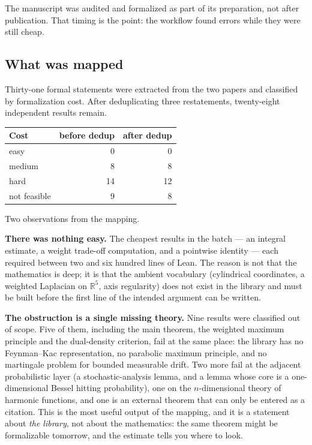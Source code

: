 \documentclass[11pt]{article}
\newcommand{\Lean}{Lean}
\newcommand{\R}{\mathbb{R}}
\begin{document}
The manuscript was audited and formalized as part of its preparation, not
after publication. That timing is the point: the workflow found errors while
they were still cheap.

\subsection{What was mapped}

Thirty-one formal statements were extracted from the two papers and classified
by formalization cost. After deduplicating three restatements, twenty-eight
independent results remain.

\begin{center}
\begin{tabular}{@{}lrr@{}}
\toprule
Cost & before dedup & after dedup \\
\midrule
easy & 0 & 0 \\
medium & 8 & 8 \\
hard & 14 & 12 \\
not feasible & 9 & 8 \\
\bottomrule
\end{tabular}
\end{center}

Two observations from the mapping.

\textbf{There was nothing easy.} The cheapest results in the batch --- an
integral estimate, a weight trade-off computation, and a pointwise identity ---
each required between two and six hundred lines of \Lean. The reason is not
that the mathematics is deep; it is that the ambient vocabulary (cylindrical
coordinates, a weighted Laplacian on $\R^5$, axis regularity) does not exist in
the library and must be built before the first line of the intended argument
can be written.

\textbf{The obstruction is a single missing theory.} Nine results were
classified out of scope. Five of them, including the main theorem, the
weighted maximum principle and the dual-density criterion, fail at the same
place: the library has no Feynman--Kac representation, no parabolic maximum
principle, and no martingale problem for bounded measurable drift. Two more
fail at the adjacent probabilistic layer (a stochastic-analysis lemma, and a
lemma whose core is a one-dimensional Bessel hitting probability), one on the
$n$-dimensional theory of harmonic functions, and one is an external theorem
that can only be entered as a citation. This is the most useful output of the mapping, and it
is a statement about \emph{the library}, not about the mathematics: the same
theorem might be formalizable tomorrow, and the estimate tells you where to
look.
\end{document}
